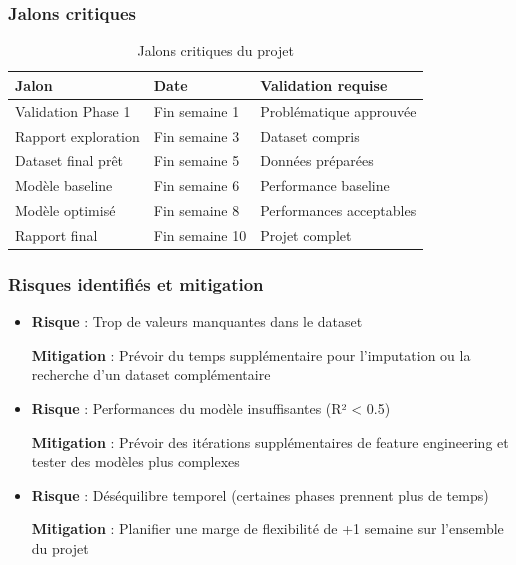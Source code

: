 \documentclass[12pt,a4paper]{article}
\begin{document}
\subsubsection{Jalons critiques}

\begin{table}[h]
\centering
\begin{tabular}{@{}lll@{}}
\toprule
\textbf{Jalon} & \textbf{Date} & \textbf{Validation requise} \\ \midrule
Validation Phase 1 & Fin semaine 1 & Problématique approuvée \\
Rapport exploration & Fin semaine 3 & Dataset compris \\
Dataset final prêt & Fin semaine 5 & Données préparées \\
Modèle baseline & Fin semaine 6 & Performance baseline \\
Modèle optimisé & Fin semaine 8 & Performances acceptables \\
Rapport final & Fin semaine 10 & Projet complet \\ \bottomrule
\end{tabular}
\caption{Jalons critiques du projet}
\end{table}

\subsubsection{Risques identifiés et mitigation}

\begin{itemize}[leftmargin=*]
    \item \textbf{Risque} : Trop de valeurs manquantes dans le dataset
    
    \textbf{Mitigation} : Prévoir du temps supplémentaire pour l'imputation ou la recherche d'un dataset complémentaire
    
    \item \textbf{Risque} : Performances du modèle insuffisantes (R² < 0.5)
    
    \textbf{Mitigation} : Prévoir des itérations supplémentaires de feature engineering et tester des modèles plus complexes
    
    \item \textbf{Risque} : Déséquilibre temporel (certaines phases prennent plus de temps)
    
    \textbf{Mitigation} : Planifier une marge de flexibilité de +1 semaine sur l'ensemble du projet
\end{itemize}
\end{document}
